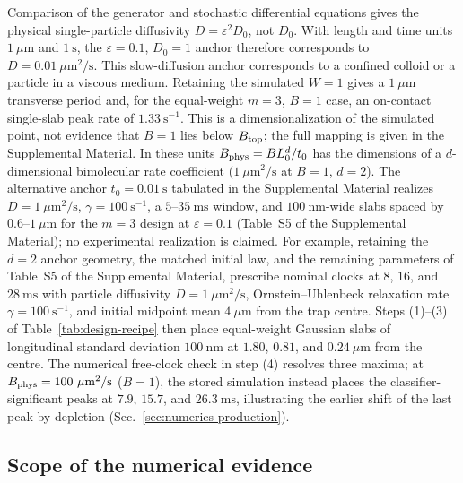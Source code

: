 \documentclass[aps,physrev,reprint,amsmath,amssymb,longbibliography,floatfix]{revtex4-2}
\begin{document}
Comparison of the generator and stochastic differential equations gives the
physical single-particle diffusivity \(D=\varepsilon^2D_0\), not \(D_0\).
With length and time units \(1~\mu\mathrm m\) and \(1~\mathrm s\), the
\(\varepsilon=0.1\), \(D_0=1\) anchor therefore corresponds to
\(D=0.01~\mu\mathrm m^2/\mathrm s\).  This slow-diffusion anchor
corresponds to a confined colloid or a particle in a viscous medium.
Retaining the simulated
\(W=1\) gives a \(1~\mu\mathrm m\) transverse period and, for the
equal-weight \(m=3\), \(B=1\) case, an on-contact single-slab peak rate of
\(1.33~\mathrm s^{-1}\).  This is a dimensionalization of the simulated
point, not evidence that \(B=1\) lies below \(B_{\rm top}\); the full
mapping is given in the Supplemental Material.
In these units \(B_{\rm phys}=BL_0^d/t_0\) has the dimensions of a
\(d\)-dimensional bimolecular rate coefficient
(\(1~\mu\mathrm m^2/\mathrm s\) at \(B=1\), \(d=2\)).  The alternative anchor \(t_0=0.01~\mathrm s\)
tabulated in the Supplemental Material realizes
\(D=1~\mu\mathrm m^2/\mathrm s\), \(\gamma=100~\mathrm s^{-1}\), a
\(5\)--\(35~\mathrm{ms}\) window, and \(100~\mathrm{nm}\)-wide slabs
spaced by \(0.6\)--\(1~\mu\mathrm m\) for the \(m=3\) design at
\(\varepsilon=0.1\) (Table~S5 of the Supplemental Material); no
experimental realization is claimed.  For example, retaining the \(d=2\)
anchor geometry, the matched initial law, and the remaining parameters of
Table~S5 of the Supplemental Material, prescribe nominal clocks at \(8\),
\(16\), and \(28~\mathrm{ms}\) with particle diffusivity
\(D=1~\mu\mathrm m^2/\mathrm s\), Ornstein--Uhlenbeck relaxation rate
\(\gamma=100~\mathrm s^{-1}\), and initial midpoint mean \(4~\mu\mathrm m\)
from the trap centre.  Steps (1)--(3) of Table~\ref{tab:design-recipe} then
place equal-weight Gaussian slabs of longitudinal standard deviation
\(100~\mathrm{nm}\) at \(1.80\), \(0.81\), and \(0.24~\mu\mathrm m\) from
the centre.  The numerical free-clock check in step (4) resolves three
maxima; at \(B_{\rm phys}=100~\mu\mathrm m^2/\mathrm s\) (\(B=1\)), the
stored simulation instead places the classifier-significant peaks at
\(7.9\), \(15.7\), and \(26.3~\mathrm{ms}\), illustrating the earlier shift
of the last peak by depletion (Sec.~\ref{sec:numerics-production}).

\subsection{Scope of the numerical evidence}
\label{sec:finite-scope}
\end{document}
